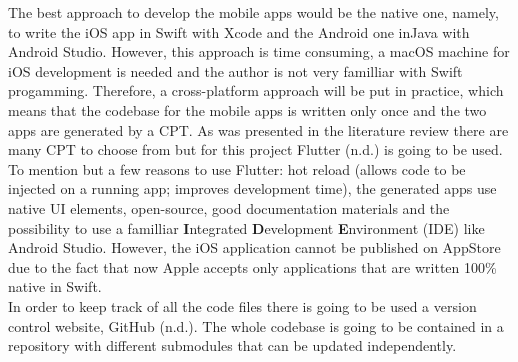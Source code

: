 \documentclass[version=last,fontsize=13pt]{scrartcl}
\begin{document}
	The best approach to develop the mobile apps would be the native one, namely, to write the iOS app in Swift with Xcode and the Android one inJava with Android Studio. However, this approach is time consuming, a macOS machine for iOS development is needed and the author is not very familliar with Swift progamming. Therefore, a cross-platform approach will be put in practice, which means that the codebase for the mobile apps is written only once and the two apps are generated by a CPT. As was presented in the literature review there are many CPT to choose from but for this project Flutter (n.d.) is going to be used. To mention but a few reasons to use Flutter: hot reload (allows code to be injected on a running app; improves development time), the generated apps use native UI elements, open-source, good documentation materials and the possibility to use a familliar \textbf{I}ntegrated \textbf{D}evelopment \textbf{E}nvironment (IDE) like Android Studio. However, the iOS application cannot be published on AppStore due to the fact that now Apple accepts only applications that are written 100\% native in Swift.\\
	\indent
	In order to keep track of all the code files there is going to  be used a version control website, GitHub (n.d.). The whole codebase is going to be contained in a repository with different submodules that can be updated independently. 
	

\end{document}
